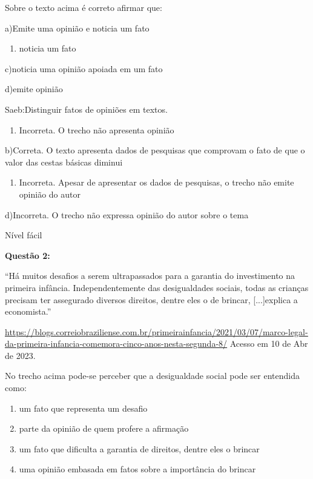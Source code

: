 {Sobre o texto acima é correto afirmar que:

a)Emite uma opinião e noticia um fato

\begin{enumerate}
\def\labelenumi{\arabic{enumi}.}
\tightlist
\item
  noticia um fato
\end{enumerate}

c)noticia uma opinião apoiada em um fato

d)emite opinião

Saeb:Distinguir fatos de opiniões em textos.

\begin{enumerate}
\def\labelenumi{\arabic{enumi}.}
\tightlist
\item
  Incorreta. O trecho não apresenta opinião
\end{enumerate}

b)Correta. O texto apresenta dados de pesquisas que comprovam o fato de
que o valor das cestas básicas diminui

\begin{enumerate}
\def\labelenumi{\arabic{enumi}.}
\tightlist
\item
  Incorreta. Apesar de apresentar os dados de pesquisas, o trecho não
  emite opinião do autor
\end{enumerate}

d)Incorreta. O trecho não expressa opinião do autor sobre o tema

Nível fácil

\textbf{Questão 2:}

``Há muitos desafios a serem ultrapassados para a garantia do
investimento na primeira infância. Independentemente das desigualdades
sociais, todas as crianças precisam ter assegurado diversos direitos,
dentre eles o de brincar, {[}...{]}explica a economista.''

\href{https://blogs.correiobraziliense.com.br/primeirainfancia/2021/03/07/marco-legal-da-primeira-infancia-comemora-cinco-anos-nesta-segunda-8/}{\uline{https://blogs.correiobraziliense.com.br/primeirainfancia/2021/03/07/marco-legal-da-primeira-infancia-comemora-cinco-anos-nesta-segunda-8/}}
Acesso em 10 de Abr de 2023.

No trecho acima pode-se perceber que a desigualdade social pode ser
entendida como:

\begin{enumerate}
\def\labelenumi{\alph{enumi})}
\item
  um fato que representa um desafio
\item
  parte da opinião de quem profere a afirmação
\item
  um fato que dificulta a garantia de direitos, dentre eles o brincar
\item
  uma opinião embasada em fatos sobre a importância do brincar
\end{enumerate}

}

